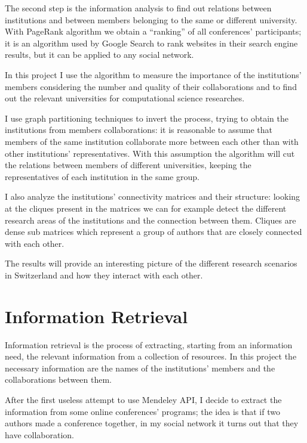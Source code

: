 \documentclass[]{usiinfbachelorproject}
\begin{document}
The second step is the information analysis to find out relations between institutions and between members belonging to the same or different university. With PageRank algorithm we obtain a ``ranking'' of all conferences' participants; it is an algorithm used by Google Search to rank websites in their search engine results, but it can be applied to any social network. 

In this project I use the algorithm to measure the importance of the institutions' members considering the number and quality of their collaborations and to find out the relevant universities for computational science researches. 

I use graph partitioning techniques to invert the process, trying to obtain the institutions from members collaborations: it is reasonable to assume that members of the same institution collaborate more between each other than with other institutions' representatives. With this assumption the algorithm will cut the relations between members of different universities, keeping the representatives of each institution in the same group.

I also analyze the institutions' connectivity matrices and their structure: looking at the cliques present in the matrices we can for example detect the different research areas of the institutions and the connection between them. Cliques are dense sub matrices which represent a group of authors that are closely connected with each other. 

The results will provide an interesting picture of the different research scenarios in Switzerland and how they interact with each other.






\section{Information Retrieval} \label{sec:inforetrieval} 

Information retrieval is the process of extracting, starting from an information need, the relevant information from a collection of resources. In this project the necessary information are the names of the institutions' members and the collaborations between them. 

After the first useless attempt to use Mendeley API, I decide to  extract the information from some online conferences' programs; the idea is that if two authors made a conference together, in my social network it turns out that they have collaboration.
\end{document}
